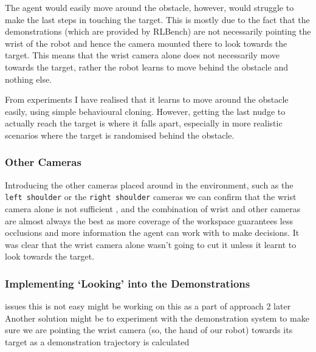 
The agent would easily move around the obstacle, however, would struggle to make the last steps in touching the target. This is mostly due to the fact that the demonstrations (which are provided by RLBench) are not necessarily pointing the wrist of the robot and hence the camera mounted there to look towards the target. This means that the wrist camera alone does not necessarily move towards the target, rather the robot learns to move behind the obstacle and nothing else.

From experiments I have realised that it learns to move around the obstacle easily, using simple behavioural cloning. However, getting the last nudge to actually reach the target is where it falls apart, especially in more realistic scenarios where the target is randomised behind the obstacle.

\subsubsection{Other Cameras}
Introducing the other cameras placed around in the environment, such as the \verb|left shoulder| or the \verb|right shoulder| cameras we can confirm that the wrist camera alone is not sufficient , and the combination of wrist and other cameras are almost always the best as more coverage of the workspace guarantees less occlusions and more information the agent can work with to make decisions. It was clear that the wrist camera alone wasn't going to cut it unless it learnt to look towards the target.

\subsubsection{Implementing `Looking' into the Demonstrations}\label{ew-looking-at-target}
issues this is not easy might be working on this as a part of approach 2 later
Another solution might be to experiment with the demonstration system to make sure we are pointing the wrist camera (so, the hand of our robot) towards its target as a demonstration trajectory is calculated 

